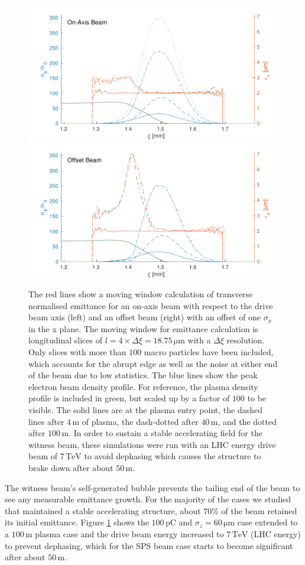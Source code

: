 \documentclass[aps,prstab,reprint,amsmath,amssymb,groupedaddress]{revtex4-1}
\newcommand{\unit}[1]{\,\mathrm{#1}}
\begin{document}

\begin{figure}[hbt]
    \includegraphics[width=0.495\linewidth,trim={2mm 0mm 2mm 0mm},clip]{figures/beamEmittance}
    \includegraphics[width=0.495\linewidth,trim={2mm 0mm 2mm 0mm},clip]{figures/beamEmittanceOffset}
    \caption{\label{Fig:BeamEmitt} The red lines show a moving window calculation of transverse normalised emittance for
        an on-axis beam with respect to the drive beam axis (left) and an offset beam (right) with an offset of one
        $\sigma_{x}$ in the x plane. The moving window for emittance calculation is longitudinal slices of
        $l = 4\times\Delta\xi = 18.75\unit{\mu m}$ with a $\Delta\xi$ resolution. Only slices with more than $100$ macro
        particles have been included, which accounts for the abrupt edge as well as the noise at either end of the beam
        due to low statistics. The blue lines show the peak electron beam density profile. For reference, the plasma 
        density profile is included in green, but scaled up by a factor of $100$ to be visible. The solid lines are at
        the plasma entry point, the dashed lines after $4\unit{m}$ of plasma, the dash-dotted after $40\unit{m}$, and
        the dotted after $100\unit{m}$. In order to sustain a stable accelerating field for the witness beam, these
        simulations were run with an LHC energy drive beam of $7\unit{TeV}$ to avoid dephasing which causes the
        structure to brake down after about $50\unit{m}$.}
\end{figure}

The witness beam's self-generated bubble prevents the tailing end of the beam to see any measurable emittance growth.
For the majority of the cases we studied that maintained a stable accelerating structure, about $70\%$ of the beam
retained its initial emittance. Figure \ref{Fig:BeamEmitt} shows the $100\unit{pC}$ and $\sigma_{z} = 60\unit{\mu m}$
case extended to a $100\unit{m}$ plasma case and the drive beam energy increased to $7\unit{TeV}$ (LHC energy) to
prevent dephasing, which for the SPS beam case starts to become significant after about $50\unit{m}$.
\end{document}
